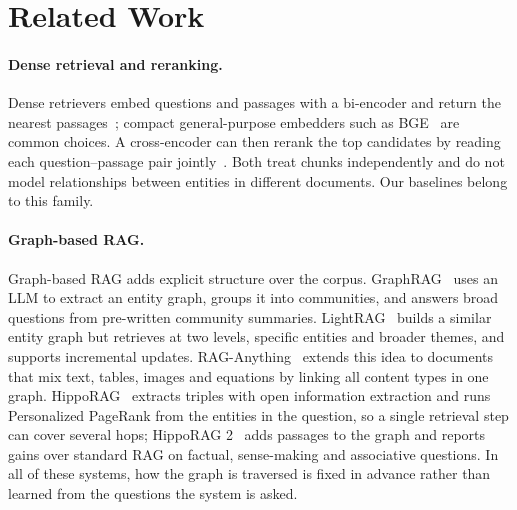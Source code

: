 \documentclass[10pt,twocolumn,letterpaper]{article}
\begin{document}
\section{Related Work}
\label{sec:related}

\paragraph{Dense retrieval and reranking.}
Dense retrievers embed questions and passages with a bi-encoder and return the nearest
passages~\cite{karpukhin2020dpr}; compact general-purpose embedders such as
BGE~\cite{xiao2023cpack} are common choices. A cross-encoder can then rerank the top candidates by
reading each question--passage pair jointly~\cite{nogueira2019monobert}. Both treat chunks
independently and do not model relationships between entities in different documents. Our baselines
belong to this family.

\paragraph{Graph-based RAG.}
Graph-based RAG adds explicit structure over the corpus. GraphRAG~\cite{edge2024graphrag} uses an
LLM to extract an entity graph, groups it into communities, and answers broad questions from
pre-written community summaries. LightRAG~\cite{guo2025lightrag} builds a similar entity graph but
retrieves at two levels, specific entities and broader themes, and supports incremental updates.
RAG-Anything~\cite{guo2025raganything} extends this idea to documents that mix text, tables, images
and equations by linking all content types in one graph. HippoRAG~\cite{gutierrez2024hipporag}
extracts triples with open information extraction and runs Personalized PageRank from the entities in
the question, so a single retrieval step can cover several hops; HippoRAG 2~\cite{gutierrez2025hipporag2}
adds passages to the graph and reports gains over standard RAG on factual, sense-making and
associative questions. In all of these systems, how the graph is traversed is fixed in advance
rather than learned from the questions the system is asked.
\end{document}
